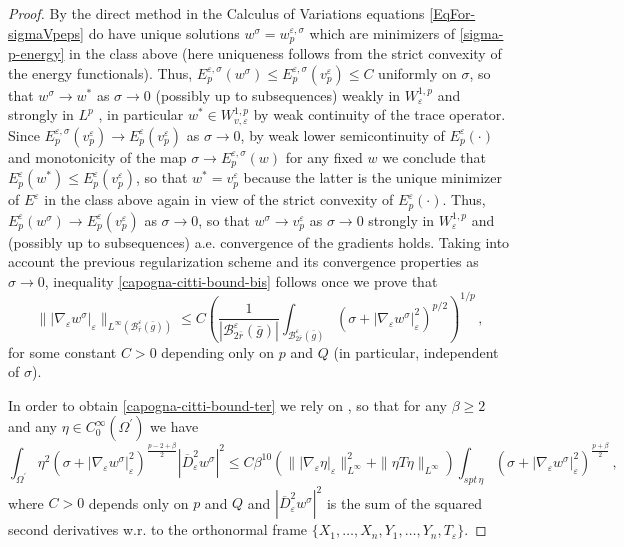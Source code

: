 \documentclass[10pt]{amsart}
\numberwithin{equation}{section}
\theoremstyle{definition}
\begin{document}
\begin{proof}
 By the direct method in the Calculus of Variations equations \eqref{EqFor-sigmaVpeps} do have unique solutions $w^\sigma=w^{\varepsilon, \sigma}_p$ which are minimizers of \eqref{sigma-p-energy} in the class above (here uniqueness follows from the strict convexity of the energy functionals). Thus, $E^{\varepsilon,\sigma}_p (w^\sigma) \leq E^{\varepsilon,\sigma}_p (v^\varepsilon_p) \leq C$ uniformly on $\sigma$, so that $w^\sigma \to w^* $ as $\sigma \to 0$ (possibly up to subsequences) weakly in $W^{1,p}_\varepsilon$ and strongly in $L^p$ , in particular $w^* \in W^{1,p}_{v,\varepsilon}$ by weak continuity of the trace operator. Since $E^{\varepsilon,\sigma}_p (v^\varepsilon_p) \to E^\varepsilon_p (v^\varepsilon_p)$ as $\sigma \to 0$, by weak lower semicontinuity of $E_p^\varepsilon(\cdot)$ and monotonicity of the map $\sigma\to E^{\varepsilon,\sigma}_p (w)$ for any fixed $w$ we conclude that $E^\varepsilon_p (w^*) \leq E^\varepsilon_p (v^\varepsilon_p)$, so that $w^*=v^\varepsilon_p$ because the latter is the unique minimizer  of $E^\varepsilon$ in the class above again in view of the strict convexity of $E_p^\varepsilon(\cdot)$. Thus,  $E^{\varepsilon}_p (w^\sigma) \to E^\varepsilon_p (v^\varepsilon_p)$ as $\sigma \to 0$, so that $w^\sigma \to v^\varepsilon_p$ as $\sigma \to 0$ strongly in $W^{1,p}_\varepsilon$ and (possibly up to subsequences)  a.e. convergence of the gradients holds. 
 Taking into account the previous regularization scheme and its convergence properties as $\sigma \to 0$, inequality \eqref{capogna-citti-bound-bis} follows once we prove that
  \begin{equation}
\label{capogna-citti-bound-ter} 
\| |\nabla_\varepsilon w^\sigma|_\varepsilon  \|_{L^\infty(\mathcal{B}^\varepsilon_{\bar{r}}(\bar{g}))} \leq C  \left( \frac{1}{|\mathcal{B}_{ 2\bar{r}}^\varepsilon(\bar{g})|}  \int_{ \mathcal{B}_{2\bar{r}}^\varepsilon(\bar{g})} \left( \sigma+|\nabla_\varepsilon w^\sigma |^2_\varepsilon\right)^{p/2} \right)^{1/p}\, ,
\end{equation}
\noindent for some constant $C>0$ depending only on $p$ and $Q$ (in particular, independent of $\sigma$). 
 
In order to obtain \eqref{capogna-citti-bound-ter} we rely on \cite[Theorem 5.3]{CapoCitti4}, so that for any $\beta \geq 2$ and any $\eta \in C^\infty_0(\Omega^\prime)$ we have
\begin{equation}
\label{gradient-caccioppoli}
\int_{\Omega^\prime} \eta^2 \left( \sigma+|\nabla_\varepsilon w^\sigma |^2_\varepsilon\right)^{\frac{p-2+\beta}2} |\overline{D}^2_\varepsilon w^\sigma |^2  \leq C \beta^{10} \left( \| | \nabla_\varepsilon \eta |_\varepsilon  \|_{L^\infty}^2 +\| \eta T \eta  \|_{L^\infty}\right)    \int_{spt \, \eta } \left( \sigma+|\nabla_\varepsilon w^\sigma |^2_\varepsilon\right)^{\frac{p+\beta}2} \, ,
\end{equation}
where $C>0$ depends only on $p$ and $Q$ and $|\overline{D}^2_\varepsilon w^\sigma |^2$ is the sum of the squared second derivatives w.r. to the orthonormal frame $\{ X_1, \ldots, X_n, Y_1 , \ldots, Y_n ,T_\varepsilon \}$.


\end{proof}
\end{document}

